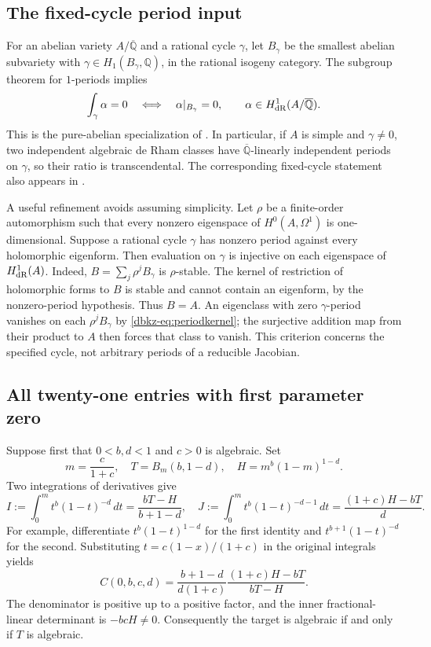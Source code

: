 \documentclass[11pt,a4paper]{article}
\theoremstyle{definition}
\theoremstyle{remark}
\numberwithin{equation}{section}
\begin{document}
\subsection{The fixed-cycle period input}
For an abelian variety $A/\overline{\mathbb Q}$ and a rational cycle
$\gamma$, let $B_\gamma$ be the smallest abelian subvariety with
$\gamma\in H_1(B_\gamma,\mathbb Q)$, in the rational isogeny category.
The subgroup theorem for $1$-periods implies
\begin{equation}\label{dbkz-eq:periodkernel}
 \int_\gamma\alpha=0\quad\Longleftrightarrow\quad
 \alpha|_{B_\gamma}=0,
 \qquad \alpha\in H^1_{\rm dR}(A/\overline{\mathbb Q}).
\end{equation}
This is the pure-abelian specialization of
\cite[Theorem 9.7]{dbkz-hw}. In particular, if $A$ is simple and
$\gamma\ne0$, two independent algebraic de Rham classes have
$\overline{\mathbb Q}$-linearly independent periods on $\gamma$, so their
ratio is transcendental. The corresponding fixed-cycle statement also
appears in \cite[Satz 1]{dbkz-ww}.

A useful refinement avoids assuming simplicity. Let $\rho$ be a
finite-order automorphism such that every nonzero eigenspace of
$H^0(A,\Omega^1)$ is one-dimensional. Suppose a rational cycle $\gamma$
has nonzero period against every holomorphic eigenform. Then evaluation
on $\gamma$ is injective on each eigenspace of $H^1_{\rm dR}(A)$.
Indeed, $B=\sum_j\rho^jB_\gamma$ is $\rho$-stable. The kernel of
restriction of holomorphic forms to $B$ is stable and cannot contain
an eigenform, by the nonzero-period hypothesis. Thus $B=A$. An
eigenclass with zero $\gamma$-period vanishes on each
$\rho^jB_\gamma$ by \eqref{dbkz-eq:periodkernel}; the surjective addition
map from their product to $A$ then forces that class to vanish.
This criterion concerns the specified cycle, not arbitrary periods of
a reducible Jacobian.

\subsection{All twenty-one entries with first parameter zero}
\label{dbkz-sec:a0}
Suppose first that $0<b,d<1$ and $c>0$ is algebraic. Set
\[
 m=\frac{c}{1+c},\quad T=B_m(b,1-d),\quad
 H=m^b(1-m)^{1-d}.
\]
Two integrations of derivatives give
\[
 I:=\int_0^m t^b(1-t)^{-d}\,dt=\frac{bT-H}{b+1-d},
 \quad
 J:=\int_0^m t^b(1-t)^{-d-1}\,dt=\frac{(1+c)H-bT}{d}.
\]
For example, differentiate $t^b(1-t)^{1-d}$ for the first identity and
$t^{b+1}(1-t)^{-d}$ for the second. Substituting
$t=c(1-x)/(1+c)$ in the original integrals yields
\begin{equation}\label{dbkz-eq:a0mobius}
 C(0,b,c,d)=\frac{b+1-d}{d(1+c)}
       \frac{(1+c)H-bT}{bT-H}.
\end{equation}
The denominator is positive up to a positive factor, and the inner
fractional-linear determinant is $-bcH\ne0$. Consequently the target
is algebraic if and only if $T$ is algebraic.
\end{document}
